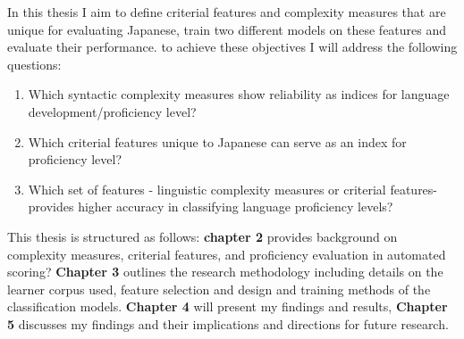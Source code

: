 In this thesis I aim to define criterial features and complexity measures that are unique for evaluating Japanese, train two different models on these features and evaluate their performance. to achieve these objectives I will address the following questions:
\begin{enumerate}
    \item Which syntactic complexity measures show reliability as indices for language development/proficiency level?
    \item Which criterial features unique to Japanese can serve as an index for proficiency level?
    \item Which set of features - linguistic complexity measures or criterial features- provides higher accuracy in classifying language proficiency levels?
\end{enumerate}

This thesis is structured as follows: \textbf{chapter 2} provides background on complexity measures, criterial features, and proficiency evaluation in automated scoring? \textbf{Chapter 3} outlines the research methodology including details on the learner corpus used, feature selection and design and training methods of the classification models. \textbf{Chapter 4} will present my findings and results, \textbf{Chapter 5} discusses my findings and their implications and directions for future research.  